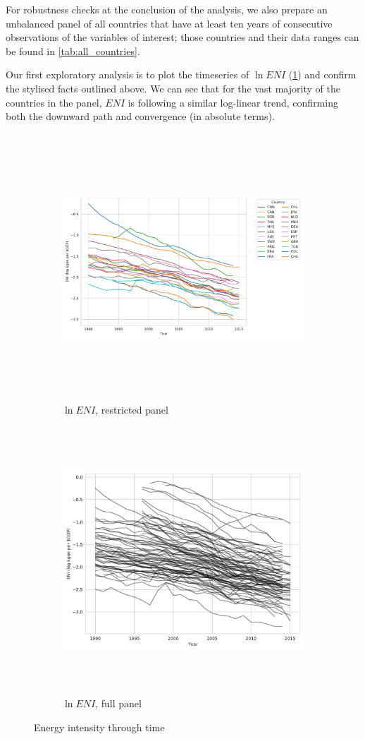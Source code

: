 \documentclass[12pt,a4paper]{article}
\begin{document}
For robustness checks at the conclusion of the analysis, we also prepare an unbalanced panel of all countries that have at least ten years of consecutive observations of the variables of interest; those countries and their data ranges can be found in \cref{tab:all_countries}.

Our first exploratory analysis is to plot the timeseries of $\ln ENI$ (\cref{fig:ENI_timeseries}) and confirm the stylised facts outlined above.
We can see that for the vast majority of the countries in the panel, $ENI$ is following a similar log-linear trend, confirming both the downward path and convergence (in absolute terms).

\begin{figure}[htbp]
\centering
\begin{subfigure}{\textwidth}
\includegraphics[height=10cm]{./plots/dis/timeseries_ENI_subset.pdf}
\caption{$\ln ENI$, restricted panel}
\end{subfigure}
\begin{subfigure}{\textwidth}
\includegraphics[height=10cm]{./plots/dis/timeseries_ENI_all.pdf}
\caption{$\ln ENI$, full panel}
\end{subfigure}
\caption{Energy intensity through time}
\label{fig:ENI_timeseries}
\end{figure}
\end{document}
